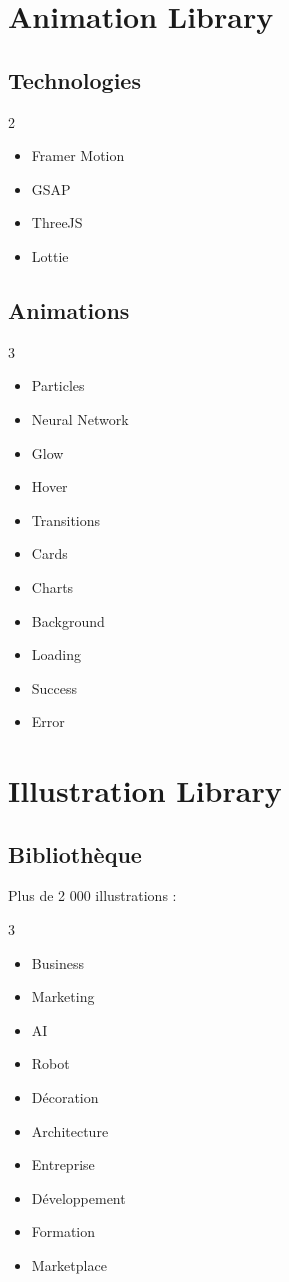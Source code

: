 \documentclass[12pt,a4paper,oneside]{book}
\begin{document}
\chapter{Animation Library}

\section{Technologies}
\begin{multicols}{2}
\begin{itemize}
\item Framer Motion
\item GSAP
\item ThreeJS
\item Lottie
\end{itemize}
\end{multicols}

\section{Animations}
\begin{multicols}{3}
\begin{itemize}
\item Particles
\item Neural Network
\item Glow
\item Hover
\item Transitions
\item Cards
\item Charts
\item Background
\item Loading
\item Success
\item Error
\end{itemize}
\end{multicols}

\chapter{Illustration Library}

\section{Bibliothèque}
Plus de 2 000 illustrations :
\begin{multicols}{3}
\begin{itemize}
\item Business
\item Marketing
\item AI
\item Robot
\item Décoration
\item Architecture
\item Entreprise
\item Développement
\item Formation
\item Marketplace
\end{itemize}
\end{multicols}
\end{document}
